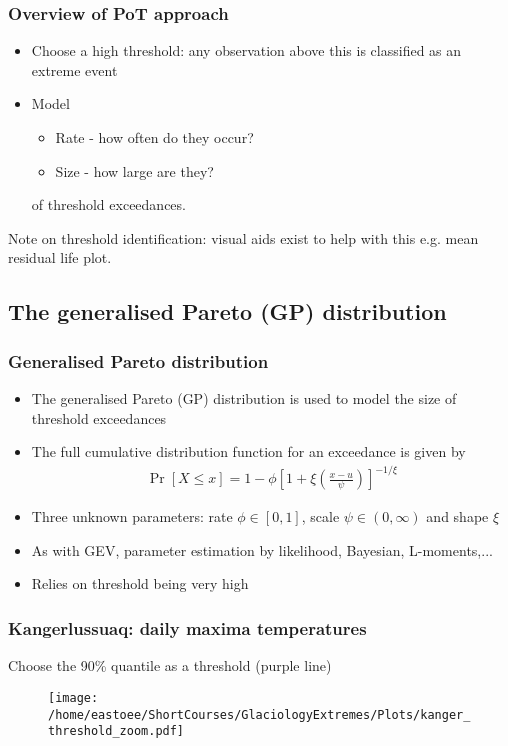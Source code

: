 \documentclass[dvipsnames]{beamer}
\begin{document}
\begin{frame}
\frametitle{Overview of PoT approach}
\begin{itemize}
\item
Choose a high threshold: any observation above this is classified as an extreme event
\item
Model
\begin{itemize}
\item
Rate - how often do they occur?
\item
Size - how large are they?
\end{itemize}
of threshold exceedances.
\end{itemize}
Note on threshold identification: visual aids exist to help with this e.g. mean residual life plot.
\end{frame}

\subsection{The generalised Pareto (GP) distribution}

\begin{frame}
\frametitle{Generalised Pareto distribution}
\begin{itemize}
\item
The generalised Pareto (GP) distribution is used to model the size of threshold exceedances
\item
The full cumulative distribution function for an exceedance is given by 
\begin{eqnarray*}
\Pr[X\leq x]=1-\phi\left[1+\xi\left(\frac{x-u}{\psi}\right)\right]^{-1/\xi}
\end{eqnarray*}
\item
Three unknown parameters: rate $\phi\in [0,1]$, scale $\psi\in(0,\infty)$ and shape $\xi$
\item
As with GEV, parameter estimation by likelihood, Bayesian, L-moments,...
\item
Relies on threshold being very high
\end{itemize}
\end{frame}

\begin{frame}
\frametitle{Kangerlussuaq: daily maxima temperatures}
Choose the 90\% quantile as a threshold (purple line)
\begin{figure}
\centering
{\texttt{[image: /home/eastoee/ShortCourses/GlaciologyExtremes/Plots/kanger\_threshold\_zoom.pdf]}}
\end{figure}
\end{frame}
\end{document}

